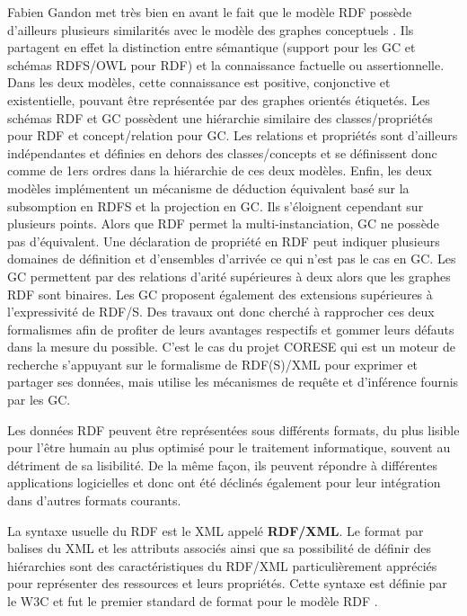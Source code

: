 Fabien Gandon met très bien en avant le fait que le modèle RDF possède d'ailleurs plusieurs similarités avec le modèle des graphes conceptuels \cite{gandon_graphes_2008}. Ils partagent en effet la distinction entre sémantique (support pour les GC et schémas RDFS/OWL pour RDF) et la connaissance factuelle ou assertionnelle. Dans les deux modèles, cette connaissance est positive, conjonctive et existentielle, pouvant être représentée par des graphes orientés étiquetés. Les schémas RDF et GC possèdent une hiérarchie similaire des classes/propriétés pour RDF et concept/relation pour GC. Les relations et propriétés sont d'ailleurs indépendantes et définies en dehors des classes/concepts et se définissent donc comme de 1ers ordres dans la hiérarchie de ces deux modèles. Enfin, les deux modèles implémentent un mécanisme de déduction équivalent basé sur la subsomption en RDFS et la projection en GC. Ils s'éloignent cependant sur plusieurs points. Alors que RDF permet la multi-instanciation, GC ne possède pas d'équivalent. Une déclaration de propriété en RDF peut indiquer plusieurs domaines de définition et d'ensembles d'arrivée ce qui n'est pas le cas en GC. Les GC permettent par des relations d'arité supérieures à deux alors que les graphes RDF sont binaires. Les GC proposent également des extensions supérieures à l'expressivité de RDF/S.
Des travaux ont donc cherché à rapprocher ces deux formalismes afin de profiter de leurs avantages respectifs et gommer leurs défauts dans la mesure du possible. C'est le cas du projet CORESE \cite{corby_searching_2006} qui est un moteur de recherche s'appuyant sur le formalisme de RDF(S)/XML pour exprimer et partager ses données, mais utilise les mécanismes de requête et d'inférence fournis par les GC.

Les données RDF peuvent être représentées sous différents formats, du plus lisible pour l'être humain au plus optimisé pour le traitement informatique, souvent au détriment de sa lisibilité. De la même façon, ils peuvent répondre à différentes applications logicielles et donc ont été déclinés également pour leur intégration dans d'autres formats courants.

La syntaxe usuelle du RDF est le XML appelé \textbf{RDF/XML}. Le format par balises du XML et les attributs associés ainsi que sa possibilité de définir des hiérarchies sont des caractéristiques du RDF/XML particulièrement appréciés pour représenter des ressources et leurs propriétés. Cette syntaxe est définie par le W3C et fut le premier standard de format pour le modèle RDF \cite{beckett2004rdf}.


